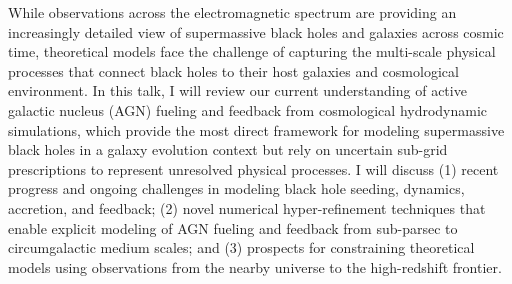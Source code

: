 While observations across the electromagnetic spectrum are providing an increasingly detailed view of supermassive black holes and galaxies across cosmic time, theoretical models face the challenge of capturing the multi-scale physical processes that connect black holes to their host galaxies and cosmological environment. In this talk, I will review our current understanding of active galactic nucleus (AGN) fueling and feedback from cosmological hydrodynamic simulations, which provide the most direct framework for modeling supermassive black holes in a galaxy evolution context but rely on uncertain sub-grid prescriptions to represent unresolved physical processes. I will discuss (1) recent progress and ongoing challenges in modeling black hole seeding, dynamics, accretion, and feedback; (2) novel numerical hyper-refinement techniques that enable explicit modeling of AGN fueling and feedback from sub-parsec to circumgalactic medium scales; and (3) prospects for constraining theoretical models using observations from the nearby universe to the high-redshift frontier.

\hypertarget{abs-29}{}
